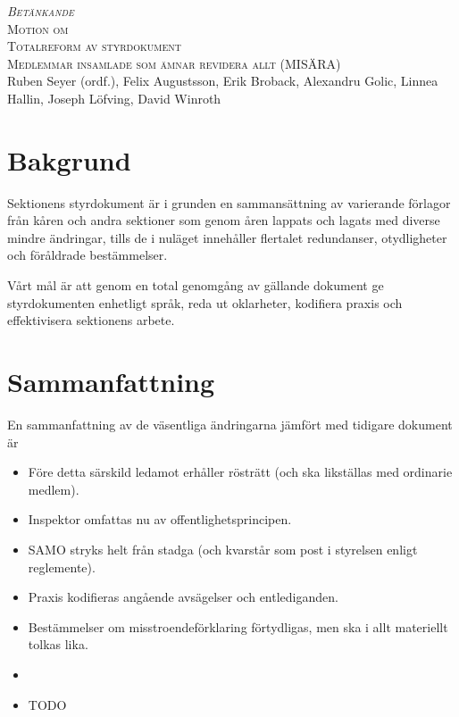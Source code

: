 \documentclass{article}
\newcommand{\motionsnamn}{Totalreform av styrdokument}
\newcommand{\motionar}{Medlemmar insamlade som ämnar revidera allt (MISÄRA)}
\begin{document}
\begin{center}
\textsc{\huge\itshape Betänkande}\\[0.5cm]
\textsc{\Huge Motion om}\\[0.5cm]
\textsc{\huge \motionsnamn}\\[0.5cm]
\textsc{\large \motionar\\}
Ruben Seyer (ordf.),
Felix Augustsson,
Erik Broback,
Alexandru Golic,
Linnea Hallin,
Joseph Löfving,
David Winroth
\end{center}

\section*{Bakgrund}
Sektionens styrdokument är i grunden en sammansättning av varierande förlagor från kåren och andra sektioner som genom åren lappats och lagats med diverse mindre ändringar, tills de i nuläget innehåller flertalet redundanser, otydligheter och föråldrade bestämmelser.

Vårt mål är att genom en total genomgång av gällande dokument ge styrdokumenten enhetligt språk, reda ut oklarheter, kodifiera praxis och effektivisera sektionens arbete.

\section*{Sammanfattning}
En sammanfattning av de väsentliga ändringarna jämfört med tidigare dokument är
\begin{itemize}
    \item Före detta särskild ledamot erhåller rösträtt (och ska likställas med ordinarie medlem).
    \item Inspektor omfattas nu av offentlighetsprincipen.
    \item SAMO stryks helt från stadga (och kvarstår som post i styrelsen enligt reglemente).
    \item Praxis kodifieras angående avsägelser och entlediganden.
    \item Bestämmelser om misstroendeförklaring förtydligas, men ska i allt materiellt tolkas lika.
    \item 
    \item TODO
\end{itemize}    
\end{document}
